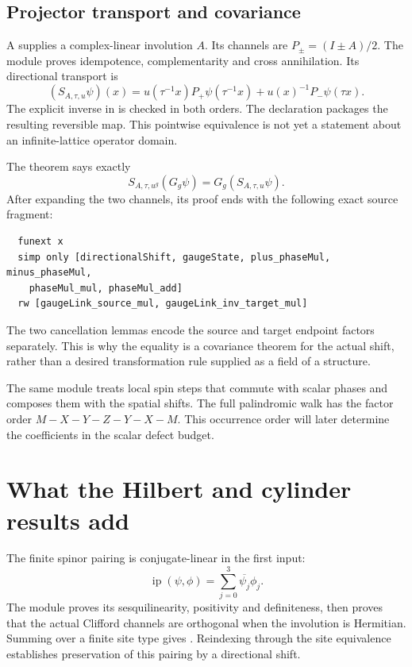 \subsection{Projector transport and covariance}

A  supplies a complex-linear involution \(A\). Its channels are \(P_\pm=(I\pm A)/2\). The module proves idempotence, complementarity and cross annihilation. Its directional transport is
\[
 (S_{A,\tau,u}\psi)(x)
 =u(\tau^{-1}x)P_+\psi(\tau^{-1}x)
  +u(x)^{-1}P_-\psi(\tau x).
\]
The explicit inverse in  is checked in both orders. The declaration  packages the resulting reversible map. This pointwise equivalence is not yet a statement about an infinite-lattice operator domain.

The theorem  says exactly
\[
 S_{A,\tau,u^g}(G_g\psi)=G_g(S_{A,\tau,u}\psi).
\]
After expanding the two channels, its proof ends with the following exact source fragment:
\begin{lstlisting}
  funext x
  simp only [directionalShift, gaugeState, plus_phaseMul, minus_phaseMul,
    phaseMul_mul, phaseMul_add]
  rw [gaugeLink_source_mul, gaugeLink_inv_target_mul]
\end{lstlisting}
The two cancellation lemmas encode the source and target endpoint factors separately. This is why the equality is a covariance theorem for the actual shift, rather than a desired transformation rule supplied as a field of a structure.

The same module treats local spin steps that commute with scalar phases and composes them with the spatial shifts. The full palindromic walk has the factor order \(M-X-Y-Z-Y-X-M\). This occurrence order will later determine the coefficients in the scalar defect budget.

\section{What the Hilbert and cylinder results add}

The finite spinor pairing is conjugate-linear in the first input:
\[
 \operatorname{ip}(\psi,\phi)=\sum_{j=0}^{3}\overline{\psi_j}\phi_j.
\]
The module  proves its sesquilinearity, positivity and definiteness, then proves that the actual Clifford channels are orthogonal when the involution is Hermitian. Summing over a finite site type gives . Reindexing through the site equivalence establishes preservation of this pairing by a directional shift.

